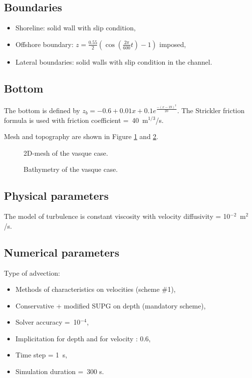 \subsection{Boundaries}

\begin{itemize}
\item Shoreline: solid wall with slip condition,
\item Offshore boundary: $z = \frac{0.55}{2}\left( \cos(\frac{2\pi}{600}t) -1 \right)$ imposed,
\item Lateral boundaries: solid walls with slip condition in the channel.
\end{itemize}

\subsection{Bottom}
The bottom is defined by $z_b = -0.6+0.01x+0.1e^{\frac{-(x-19)^2}{20}}$.
The Strickler friction formula is used with friction coefficient =~40~m$^{1/3}$/s.

Mesh and topography are shown in Figure \ref{fig:vasque:Mesh} and \ref{fig:vasque:Bottom}.

\begin{figure}[H]
 \centering
  \caption{2D-mesh of the vasque case.}\label{fig:vasque:Mesh}
\end{figure}
\begin{figure}[H]
 \centering
  \caption{Bathymetry of the vasque case.}\label{fig:vasque:Bottom}
\end{figure}

\subsection{Physical parameters}

The model of turbulence is constant viscosity
with velocity diffusivity = 10$^{-2}$~m$^2$/s.

\subsection{Numerical parameters}
Type of advection:
\begin{itemize}
\item Methods of characteristics on velocities (scheme \#1),
\item Conservative + modified SUPG on depth (mandatory scheme),
\item Solver accuracy =~10$^{-4}$,
\item Implicitation for depth and for velocity : 0.6,
\item Time step = 1~s,
\item Simulation duration =~300 s.
\end{itemize}

